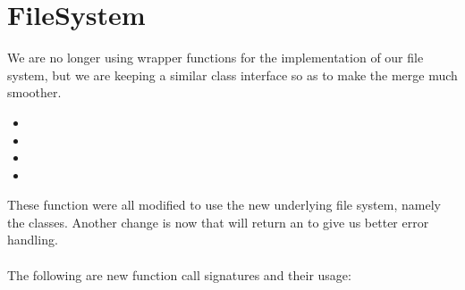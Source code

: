 \section{FileSystem}
\label{xref:filesystemFS}
  We are no longer using wrapper functions for the implementation of
  our file system, but we are keeping a similar class interface so as to make
  the merge much smoother.
  \\
  \begin{itemize}
      \item		{}
      \item		{}
      \item		{} 
      \item		{}
  \end{itemize}
  These function were all modified to use the new underlying file system, 
  namely the  classes.  Another change is now that 
   will return an  to give us better
  error handling.
  \\\\
  The following are new function call signatures and their usage:
  \\
